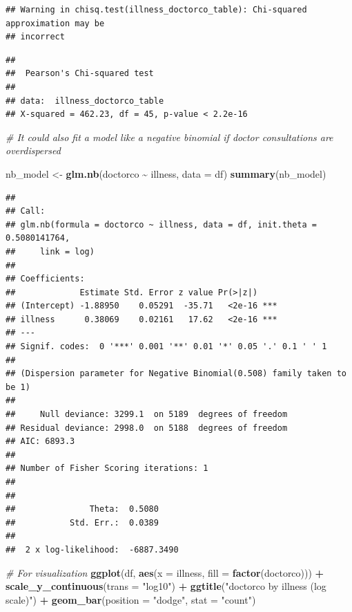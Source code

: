 \documentclass[
]{article}
\newenvironment{Shaded}{\begin{snugshade}}{\end{snugshade}}
\newcommand{\AttributeTok}[1]{\textcolor[rgb]{0.13,0.29,0.53}{#1}}
\newcommand{\CommentTok}[1]{\textcolor[rgb]{0.56,0.35,0.01}{\textit{#1}}}
\newcommand{\FunctionTok}[1]{\textcolor[rgb]{0.13,0.29,0.53}{\textbf{#1}}}
\newcommand{\NormalTok}[1]{#1}
\newcommand{\OtherTok}[1]{\textcolor[rgb]{0.56,0.35,0.01}{#1}}
\newcommand{\SpecialCharTok}[1]{\textcolor[rgb]{0.81,0.36,0.00}{\textbf{#1}}}
\newcommand{\StringTok}[1]{\textcolor[rgb]{0.31,0.60,0.02}{#1}}
\begin{document}
\begin{verbatim}
## Warning in chisq.test(illness_doctorco_table): Chi-squared approximation may be
## incorrect
\end{verbatim}

\begin{verbatim}
## 
##  Pearson's Chi-squared test
## 
## data:  illness_doctorco_table
## X-squared = 462.23, df = 45, p-value < 2.2e-16
\end{verbatim}

\begin{Shaded}
\begin{Highlighting}[]
\CommentTok{\# It could also fit a model like a negative binomial if doctor consultations are overdispersed}

\NormalTok{nb\_model }\OtherTok{\textless{}{-}} \FunctionTok{glm.nb}\NormalTok{(doctorco }\SpecialCharTok{\textasciitilde{}}\NormalTok{ illness, }\AttributeTok{data =}\NormalTok{ df)}
\FunctionTok{summary}\NormalTok{(nb\_model)}
\end{Highlighting}
\end{Shaded}

\begin{verbatim}
## 
## Call:
## glm.nb(formula = doctorco ~ illness, data = df, init.theta = 0.5080141764, 
##     link = log)
## 
## Coefficients:
##             Estimate Std. Error z value Pr(>|z|)    
## (Intercept) -1.88950    0.05291  -35.71   <2e-16 ***
## illness      0.38069    0.02161   17.62   <2e-16 ***
## ---
## Signif. codes:  0 '***' 0.001 '**' 0.01 '*' 0.05 '.' 0.1 ' ' 1
## 
## (Dispersion parameter for Negative Binomial(0.508) family taken to be 1)
## 
##     Null deviance: 3299.1  on 5189  degrees of freedom
## Residual deviance: 2998.0  on 5188  degrees of freedom
## AIC: 6893.3
## 
## Number of Fisher Scoring iterations: 1
## 
## 
##               Theta:  0.5080 
##           Std. Err.:  0.0389 
## 
##  2 x log-likelihood:  -6887.3490
\end{verbatim}

\begin{Shaded}
\begin{Highlighting}[]
\CommentTok{\# For visualization}
\FunctionTok{ggplot}\NormalTok{(df, }\FunctionTok{aes}\NormalTok{(}\AttributeTok{x =}\NormalTok{ illness, }\AttributeTok{fill =} \FunctionTok{factor}\NormalTok{(doctorco))) }\SpecialCharTok{+} 
  \FunctionTok{scale\_y\_continuous}\NormalTok{(}\AttributeTok{trans =} \StringTok{"log10"}\NormalTok{) }\SpecialCharTok{+}
  \FunctionTok{ggtitle}\NormalTok{(}\StringTok{"\textquotesingle{}doctorco\textquotesingle{} by \textquotesingle{}illness\textquotesingle{} (log scale)"}\NormalTok{) }\SpecialCharTok{+}
  \FunctionTok{geom\_bar}\NormalTok{(}\AttributeTok{position =} \StringTok{"dodge"}\NormalTok{, }\AttributeTok{stat =} \StringTok{"count"}\NormalTok{)}
\end{Highlighting}
\end{Shaded}
\end{document}
